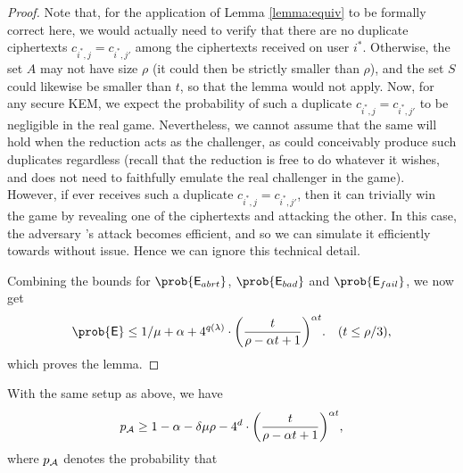 \begin{proof}
  Note that, for the application of Lemma \ref{lemma:equiv} to be formally correct here,
  we would actually need to verify that there are no duplicate ciphertexts
  \(c_{i^{*},j} = c_{i^{*},j'}\) among the ciphertexts received on user \(i^{*}\).
  Otherwise, the set \(A\) may not have size \(\rho\)
  (it could then be strictly smaller than \(\rho\)),
  and the set \(S\) could likewise be smaller than \(t\),
  so that the lemma would not apply.
  Now, for any secure KEM, we expect the probability of such a
  duplicate \(c_{i^{*},j} = c_{i^{*},j'}\) to be negligible in the real \OWECPA game.
  Nevertheless, we cannot assume that the same will hold
  when the reduction \redR acts as the challenger,
  as \redR could conceivably produce such duplicates regardless
  (recall that the reduction is free to do whatever it wishes, and does not need to
  faithfully emulate the real challenger in the \OWECPA game).
  However, if \advA ever receives such a duplicate \(c_{i^{*},j} = c_{i^{*},j'}\),
  then it can trivially win the \OWECPA game by revealing one of the ciphertexts and attacking the other.
  In this case, the adversary \advA's attack becomes efficient,
  and so we can simulate it efficiently towards \redR without issue.
  Hence we can ignore this technical detail.

  Combining the bounds for \(\prob{\eventE_{abrt}}\), \(\prob{\eventE_{bad}}\) and \(\prob{\eventE_{fail}}\), we now get
  \begin{align}\label{ineq:E}
    \prob{\eventE} \le 1 / \mu + \alpha
    + 4^{q(\lambda)} \cdot \left( \frac{t}{\rho - \alpha t + 1} \right)^{\alpha t}. && (t \le \rho / 3),
  \end{align}
  which proves the lemma.
\end{proof}

\begin{lemma}\label{lemma:A}
  With the same setup as above, we have
  \begin{equation}
    p_{\advA} \ge 1 - \alpha - \delta \mu \rho
    - 4^{d} \cdot \left( \frac{t}{\rho - \alpha t + 1} \right)^{\alpha t},
  \end{equation}
  where \(p_{\mathcal{A}}\) denotes the probability that 
\end{lemma}

